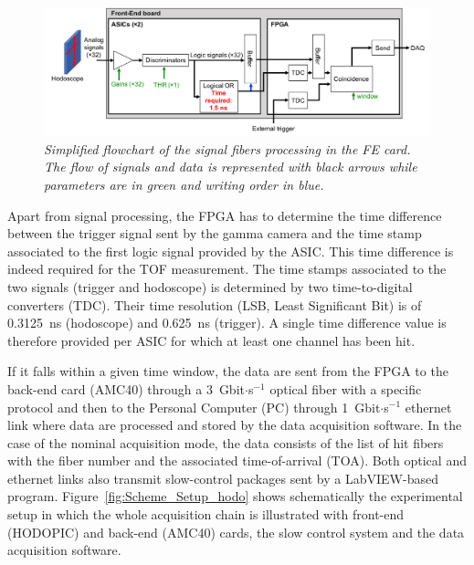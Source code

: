 \documentclass[a4paper,11pt]{article}
\begin{document}
\begin{figure}[htb]
\centering
\includegraphics[width=\textwidth]{figures/Hodoscope_reading_scheme.pdf}
\caption{\small{\textit{Simplified flowchart of the signal fibers processing in the FE card. The flow of signals and data is represented with black arrows while parameters are in green and writing order in blue.}}}
\label{fig:Scheme_reading_hodo}
\end{figure} 

Apart from signal processing, the FPGA has to determine the time difference between the trigger signal sent by the gamma camera and the time stamp associated to the first logic signal provided by the ASIC. This time difference is indeed required for the TOF measurement. The time stamps associated to the two signals (trigger and hodoscope) is determined by two time-to-digital converters (TDC). Their time resolution (LSB, Least Significant Bit) is of 0.3125~ns (hodoscope) and 0.625~ns (trigger). A single time difference value is therefore provided per ASIC for which at least one channel has been hit.

If it falls within a given time window, the data are sent from the FPGA to the back-end card (AMC40) \cite{Cachemiche2010} through a 3~Gbit$\cdot$s$^{-1}$ optical fiber with a specific protocol \cite{deng2013, Chen2017, Chen2019, Caplan2019} and then to the Personal Computer (PC) through 1~Gbit$\cdot$s$^{-1}$ ethernet link where data are processed and stored by the data acquisition software. In the case of the nominal acquisition mode, the data consists of the list of hit fibers with the fiber number and the associated time-of-arrival (TOA). Both optical and ethernet links also transmit slow-control packages sent by a LabVIEW-based program. Figure~\ref{fig:Scheme_Setup_hodo} shows schematically the experimental setup in which the whole acquisition chain is illustrated with front-end (HODOPIC) and back-end (AMC40) cards, the slow control system  and the data acquisition software.
\end{document}
